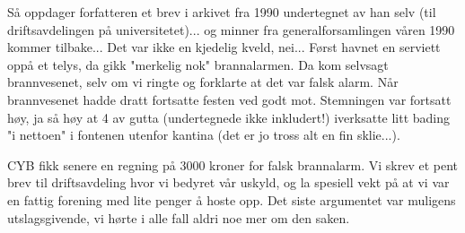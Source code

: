 \documentclass[../main.tex]{subfiles}
\begin{document}
Så oppdager forfatteren et brev i arkivet fra 1990 undertegnet av han selv (til driftsavdelingen på universitetet)... og minner fra generalforsamlingen våren 1990 kommer tilbake... Det var ikke en kjedelig kveld, nei... Først havnet en serviett oppå et telys, da gikk "merkelig nok" brannalarmen. Da kom selvsagt brannvesenet, selv om vi ringte og forklarte at det var falsk alarm. Når brannvesenet hadde dratt fortsatte festen ved godt mot. Stemningen var fortsatt høy, ja så høy at 4 av gutta (undertegnede ikke inkludert!) iverksatte litt bading "i nettoen" i fontenen utenfor kantina (det er jo tross alt en fin sklie...).

CYB fikk senere en regning på 3000 kroner for falsk brannalarm. Vi skrev et pent brev til driftsavdeling hvor vi bedyret vår uskyld, og la spesiell vekt på at vi var en fattig forening med lite penger å hoste opp. Det siste argumentet var muligens utslagsgivende, vi hørte i alle fall aldri noe mer om den saken.
\end{document}
